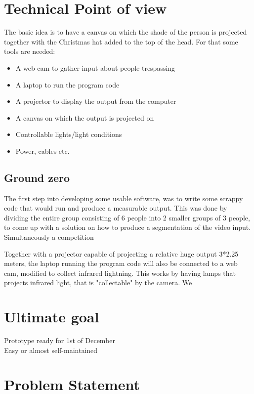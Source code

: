 \section{Technical Point of view}
The basic idea is to have a canvas on which the shade of the person is projected together with the Christmas hat added to the top of the head. For that some tools are needed:

\begin{itemize}
\item A web cam to gather input about people trespassing
\item A laptop to run the program code
\item A projector to display the output from the computer
\item A canvas on which the output is projected on
\item Controllable lights/light conditions
\item Power, cables etc.
\end{itemize}

\subsection{Ground zero}
The first step into developing some usable software, was to write some scrappy  code that would run and produce a measurable  output. This was done by dividing the entire group consisting of 6 people into 2 smaller groups of 3 people, to come up with a solution on how to produce a segmentation of the video input. Simultaneously a competition

Together with a projector capable of projecting a relative huge output 3*2.25 meters, the laptop running the program code will also be connected to a web cam, modified to collect infrared lightning. This works by having  lamps that projects infrared light, that is "collectable" by the camera. We 

\section{Ultimate goal}
Prototype ready for 1st of December\\
Easy or almost self-maintained
\section{Problem Statement}
      
